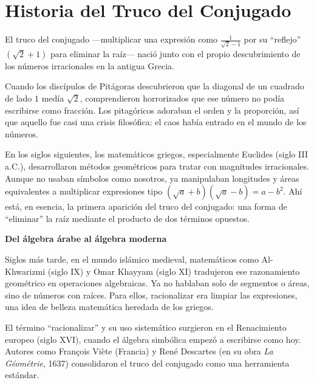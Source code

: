 
\vspace{0.5cm}

\vspace{1em} %
\section*{Historia del Truco del Conjugado}

\begin{reseñaplana}
El truco del conjugado —multiplicar una expresión como $\tfrac{1}{\sqrt{2}-1}$ por su “reflejo” $(\sqrt{2}+1)$ 
para eliminar la raíz— nació junto con el propio descubrimiento de los números irracionales en la antigua Grecia.

Cuando los discípulos de Pitágoras descubrieron que la diagonal de un cuadrado de lado $1$ medía $\sqrt{2}$, 
comprendieron horrorizados que ese número no podía escribirse como fracción. Los pitagóricos adoraban el orden y 
la proporción, así que aquello fue casi una crisis filosófica: el caos había entrado en el mundo de los números.

En los siglos siguientes, los matemáticos griegos, especialmente Euclides (siglo III a.C.), desarrollaron métodos 
geométricos para tratar con magnitudes irracionales. Aunque no usaban símbolos como nosotros, ya manipulaban longitudes 
y áreas equivalentes a multiplicar expresiones tipo $(\sqrt{a}+b)(\sqrt{a}-b)=a-b^{2}$. Ahí está, en esencia, la primera 
aparición del truco del conjugado: una forma de “eliminar” la raíz mediante el producto de dos términos opuestos.

\textbf{Del álgebra árabe al álgebra moderna}

Siglos más tarde, en el mundo islámico medieval, matemáticos como Al-Khwarizmi (siglo IX) y Omar Khayyam (siglo XI) 
tradujeron ese razonamiento geométrico en operaciones algebraicas. Ya no hablaban solo de segmentos o áreas, sino de 
números con raíces. Para ellos, racionalizar era limpiar las expresiones, una idea de belleza matemática heredada de los griegos.

El término “racionalizar” y su uso sistemático surgieron en el Renacimiento europeo (siglo XVI), cuando el álgebra 
simbólica empezó a escribirse como hoy. Autores como François Viète (Francia) y René Descartes (en su obra \textit{La Géométrie}, 1637) 
consolidaron el truco del conjugado como una herramienta estándar.
\end{reseñaplana}

